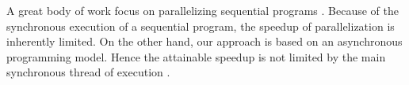 A great body of work focus on parallelizing sequential programs \cite{Banerjee2013,Li2012,Matsakis2012a,Radoi2014}. %
Because of the synchronous execution of a sequential program, the speedup of parallelization is inherently limited.
On the other hand, our approach is based on an asynchronous programming model.
Hence the attainable speedup is not limited by the main synchronous thread of execution \cite{Amdahl1967,Gunther2008}.


